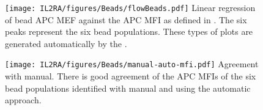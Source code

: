 \begin{figure}[hb]
\centering
\texttt{[image: IL2RA/figures/Beads/flowBeads.pdf]}
{ Linear regression of bead APC MEF against the APC MFI as defined in .}
{
The six peaks represent the six bead populations.
These types of plots are generated automatically by the .
}
\end{figure}


\begin{figure}[hb]
\centering
\texttt{[image: IL2RA/figures/Beads/manual-auto-mfi.pdf]}
{ Agreement with manual.  }
{ There is good agreement of the APC MFIs of the six bead populations identified with manual and using the automatic approach. }
\end{figure}



